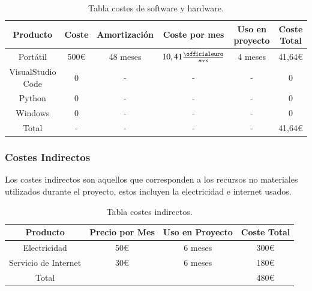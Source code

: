 \begin{table}[H]
    \centering
    \begin{tabular}{|c|c|c|c|c|c|}
        \hline
        \textbf{Producto} & \textbf{Coste} & \textbf{Amortización}&
        \textbf{Coste por mes}& \textbf{Uso en proyecto}& \textbf{Coste Total}\\
        \hline

        Portátil          & 500€   & 48 meses & $10,41\frac{\textrm{\officialeuro}}{mes}$ & 4 meses & 41,64€ \\ \hline
        VisualStudio Code & 0      & -        & -                                         & -       & 0      \\ \hline
        Python            & 0      & -        & -                                         & -       & 0      \\ \hline
        Windows           & 0      & -        & -                                         & -       & 0      \\ \hline
        Total             & -      & -        & -                                         & -       & 41,64€ \\ \hline
    \end{tabular}
    \caption{Tabla costes de software y hardware.}
    \label{tab:03_30}
\end{table}

\subsubsection{Costes Indirectos}
Los costes indirectos son aquellos que corresponden a los recursos no
materiales utilizados durante el proyecto, estos incluyen la electricidad e
internet usados.
\begin{table}[H]
    \centering
    \begin{tabular}{|c|c|c|c|}
        \hline
        \textbf{Producto} & \textbf{Precio por Mes} & \textbf{Uso en Proyecto} & \textbf{Coste Total}  \\ \hline
        Electricidad         & 50€  & 6 meses  & 300€ \\ \hline
        Servicio de Internet & 30€  & 6 meses  & 180€ \\ \hline
        Total                &      &          & 480€ \\ \hline
    \end{tabular}
    \caption{Tabla costes indirectos.}
    \label{tab:03_31}

\end{table}

